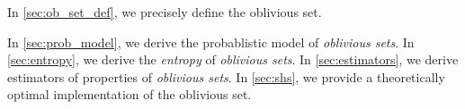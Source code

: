 \documentclass[ ../main.tex]{subfiles}
\begin{document}
In \cref{sec:ob_set_def}, we precisely define the oblivious set.


In \cref{sec:prob_model}, we derive the probablistic model of \emph{oblivious sets}. In \cref{sec:entropy}, we derive the \emph{entropy} of \emph{oblivious sets}. In \cref{sec:estimators}, we derive estimators of properties of \emph{oblivious sets}. In \cref{sec:shs}, we provide a theoretically optimal implementation of the oblivious set.
\end{document}
